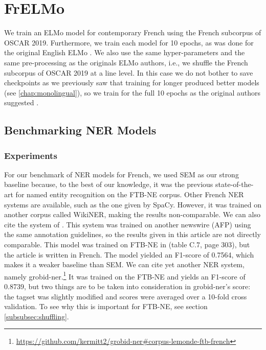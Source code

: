 \section{FrELMo}

We train an ELMo model for contemporary French using the French subcorpus of OSCAR 2019. Furthermore, we train each model for 10 epochs, as was done for the original English ELMo \citep{peters-etal-2018-deep}. We also use the same hyper-parameters and the same pre-processing as the originals ELMo authors, i.e., we shuffle the French subcorpus of OSCAR 2019 at a line level. In this case we do not bother to save checkpoints as we previously saw that training for longer produced better models (see \ref{chap:monolingual}), so we train for the full 10 epochs as the original authors suggested \citep{peters-etal-2018-deep}.

\subsection{Benchmarking NER Models}

\subsubsection{Experiments}
For our benchmark of NER models for French, we used SEM \citep{dupont-2017-exploration} as our strong baseline because, to the best of our knowledge, it was the previous state-of-the-art for named entity recognition on the FTB-NE corpus. Other French NER systems are available, such as the one given by SpaCy. However, it was trained on another corpus called WikiNER, making the results non-comparable. We can also cite the system of \citep{stern-etal-2012-joint}. This system was trained on another newswire (AFP) using the same annotation guidelines, so the results given in this article are not directly comparable. This model was trained on FTB-NE in \citet{stern-2013-identification} (table C.7, page 303), but the article is written in French. The model yielded an F1-score of 0.7564, which makes it a weaker baseline than SEM. We can cite yet another NER system, namely grobid-ner.\footnote{\url{https://github.com/kermitt2/grobid-ner\#corpus-lemonde-ftb-french}} It was trained on the FTB-NE and yields an F1-score of 0.8739, but two things are to be taken into consideration in grobid-ner's score: the tagset was slightly modified and scores were averaged over a 10-fold cross validation. To see why this is important for FTB-NE, see section \ref{subsubsec:shuffling}.

